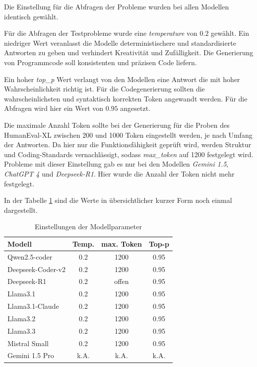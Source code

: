 Die Einstellung für die Abfragen der Probleme wurden bei allen Modellen identisch gewählt.\vspace{0.2cm}

Für die Abfragen der Testprobleme wurde eine \textit{temperature} von $0.2$ gewählt. Ein niedriger Wert veranlasst die Modelle deterministischere und standardisierte Antworten zu geben und verhindert Kreativität und Zufälligkeit. Die Generierung von Programmcode soll konsistenten und präzisen Code liefern.\vspace{0.2cm}

Ein hoher \textit{top\_p} Wert verlangt von den Modellen eine Antwort die mit hoher Wahrscheinlichkeit richtig ist. Für die Codegenerierung sollten die wahrscheinlichsten und syntaktisch korrekten Token angewandt werden. Für die Abfragen wird hier ein Wert von $0.95$ angesetzt.\vspace{0.2cm}

Die maximale Anzahl Token sollte bei der Generierung für die Proben des HumanEval-XL zwischen 200 und 1000 Token eingestellt werden, je nach Umfang der Antworten. Da hier nur die Funktionsfähigkeit geprüft wird, werden Struktur und Coding-Standards vernachlässigt, sodass \textit{max\_token} auf 1200 festgelegt wird. Probleme mit dieser Einstellung gab es nur bei den Modellen \textit{Gemini 1.5}, \textit{ChatGPT 4} und \textit{Deepseek-R1}. Hier wurde die Anzahl der Token nicht mehr festgelegt.\vspace{0.2cm}

In der Tabelle \ref{tab:params_for_llms} sind die Werte in übersichtlicher kurzer Form noch einmal dargestellt.

\begin{table}[!ht]
	\begin{tabular}{|l|c|c|c|}
		\hline
		\textbf{Modell} & \textbf{Temp.} & \textbf{max. Token} & \textbf{Top-p} \\
		\hline
		Qwen2.5-coder     &  0.2 &  1200 & 0.95 \\
		Deepseek-Coder-v2 &  0.2 &  1200 & 0.95 \\
		Deepseek-R1       &  0.2 & offen & 0.95 \\
		Llama3.1          &  0.2 &  1200 & 0.95 \\
		Llama3.1-Claude   &  0.2 &  1200 & 0.95 \\
		Llama3.2          &  0.2 &  1200 & 0.95 \\
		Llama3.3          &  0.2 &  1200 & 0.95 \\
		Mistral Small     &  0.2 &  1200 & 0.95 \\
		Gemini 1.5 Pro    & k.A. &  k.A. & k.A. \\
		\hline
		\hline
	\end{tabular}
	\centering
	\caption{Einstellungen der Modellparameter}
	\label{tab:params_for_llms}
\end{table}

